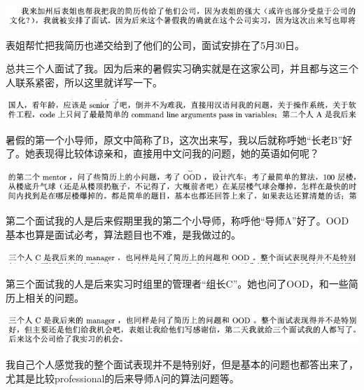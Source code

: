 \documentclass[9pt, b5paper]{article}
\begin{document}
\begin{center}
\includegraphics[width=.9\linewidth]{./pic/backups_plans_20210504_205414.png}
\end{center}

表姐帮忙把我简历也递交给到了他们的公司，面试安排在了5月30日。

总共三个人面试了我。因为后来的暑假实习确实就是在这家公司，并且都与这三个人联系紧密，所以这里就详写一下。 

\begin{center}
\includegraphics[width=.9\linewidth]{./pic/backups_plans_20210504_205755.png}
\end{center}

暑假的第一个小导师，原文中简称了B，这次出来写，我以后就称呼她“长老B”好了。她表现得比较体谅亲和，直接用中文问我的问题，她的英语如何呢？

\begin{center}
\includegraphics[width=.9\linewidth]{./pic/backups_plans_20210504_205858.png}
\end{center}

第二个面试我的人是后来假期里我的第二个小导师，称呼他“导师A”好了。OOD基本也算是面试必考，算法题目也不难，是我做过的。 

\begin{center}
\includegraphics[width=.9\linewidth]{./pic/backups_plans_20210504_210005.png}
\end{center}

第三个面试我的人是后来实习时组里的管理者“组长C”。她也问了OOD，和一些简历上相关的问题。

\begin{center}
\includegraphics[width=.9\linewidth]{./pic/backups_plans_20210504_210135.png}
\end{center}

我自己个人感觉我的整个面试表现并不是特别好，但是基本的问题也都答出来了，尤其是比较professional的后来导师A问的算法问题等。
\end{document}
